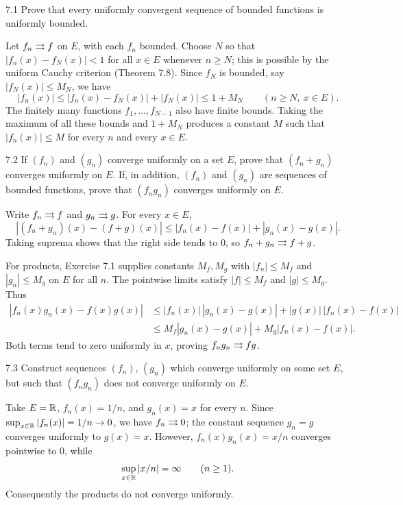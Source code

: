 \documentclass[11pt, oneside]{article}
\begin{document}

\begin{exercise}{7.1}
Prove that every uniformly convergent sequence of bounded functions is uniformly bounded.
\end{exercise}
\begin{solution}
Let $f_n\rightrightarrows f$ on $E$, with each $f_n$ bounded. Choose $N$ so that
$|f_n(x)-f_N(x)|<1$ for all $x\in E$ whenever $n\ge N$; this is possible by the uniform Cauchy criterion (Theorem 7.8). Since $f_N$ is bounded, say $|f_N(x)|\le M_N$, we have
\[
 |f_n(x)|\le |f_n(x)-f_N(x)|+|f_N(x)|\le 1+M_N
 \qquad (n\ge N, \ x\in E).
\]
The finitely many functions $f_1, \ldots, f_{N-1}$ also have finite bounds. Taking the maximum of all these bounds and $1+M_N$ produces a constant $M$ such that $|f_n(x)|\le M$ for every $n$ and every $x\in E$.
\end{solution}

\begin{exercise}{7.2}
If $(f_n)$ and $(g_n)$ converge uniformly on a set $E$, prove that $(f_n+g_n)$ converges uniformly on $E$. If, in addition, $(f_n)$ and $(g_n)$ are sequences of bounded functions, prove that $(f_ng_n)$ converges uniformly on $E$.
\end{exercise}
\begin{solution}
Write $f_n\rightrightarrows f$ and $g_n\rightrightarrows g$. For every $x\in E$,
\[
 |(f_n+g_n)(x)-(f+g)(x)|\le |f_n(x)-f(x)|+|g_n(x)-g(x)|.
\]
Taking suprema shows that the right side tends to $0$, so $f_n+g_n\rightrightarrows f+g$.

For products, Exercise 7.1 supplies constants $M_f, M_g$ with $|f_n|\le M_f$ and $|g_n|\le M_g$ on $E$ for all $n$. The pointwise limits satisfy $|f|\le M_f$ and $|g|\le M_g$. Thus
\[
 \begin{aligned}
 |f_n(x)g_n(x)-f(x)g(x)|
 &\le |f_n(x)|\,|g_n(x)-g(x)|+|g(x)|\,|f_n(x)-f(x)|\\
 &\le M_f|g_n(x)-g(x)|+M_g|f_n(x)-f(x)|.
 \end{aligned}
\]
Both terms tend to zero uniformly in $x$, proving $f_ng_n\rightrightarrows fg$.
\end{solution}

\begin{exercise}{7.3}
Construct sequences $(f_n)$, $(g_n)$ which converge uniformly on some set $E$, but such that $(f_ng_n)$ does not converge uniformly on $E$.
\end{exercise}
\begin{solution}
Take $E=\mathbb{R}$, $f_n(x)=1/n$, and $g_n(x)=x$ for every $n$. Since $\sup_{x\in\mathbb{R}}|f_n(x)|=1/n\to0$, we have $f_n\rightrightarrows0$; the constant sequence $g_n=g$ converges uniformly to $g(x)=x$. However, $f_n(x)g_n(x)=x/n$ converges pointwise to $0$, while
\[
 \sup_{x\in\mathbb{R}}|x/n|=\infty\qquad(n\ge1).
\]
Consequently the products do not converge uniformly.
\end{solution}
\end{document}
